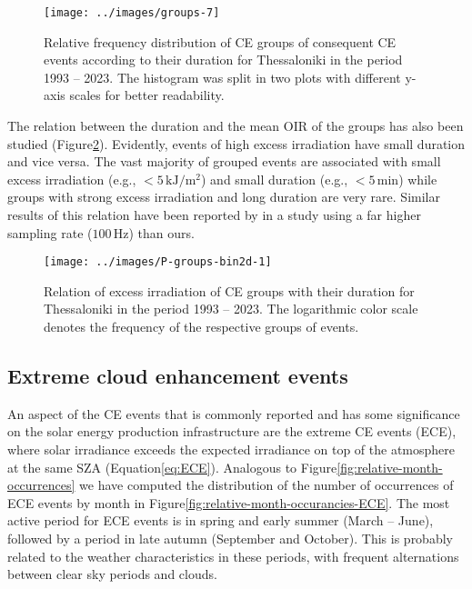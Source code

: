 \documentclass[preprint, 5p,
authoryear]{elsarticle} %
\begin{document}
\begin{figure}

{\centering \texttt{[image: ../images/groups-7]} 

}

\caption{Relative frequency distribution of CE groups of consequent CE events according to their duration for Thessaloniki in the period 1993 -- 2023. The histogram was split in two plots with different y-axis scales for better readability.}\label{fig:ceg-duration-distribution}
\end{figure}

The relation between the duration and the mean OIR of the groups has
also been studied (Figure\nobreakspace{}\ref{fig:group-2d}). Evidently,
events of high excess irradiation have small duration and vice versa.
The vast majority of grouped events are associated with small excess
irradiation (e.g., \(<5\,\text{kJ}/\text{m}^2\)) and small duration
(e.g., \(<5\,\text{min}\)) while groups with strong excess irradiation
and long duration are very rare. Similar results of this relation have
been reported by \citet{Zhang2018} in a study using a far higher
sampling rate (\(100\,\text{Hz}\)) than ours.

\begin{figure}

{\centering \texttt{[image: ../images/P-groups-bin2d-1]} 

}

\caption{Relation of excess irradiation of CE groups with their duration for Thessaloniki in the period 1993 -- 2023. The logarithmic color scale denotes the frequency of the respective groups of events.}\label{fig:group-2d}
\end{figure}

\hypertarget{extreme-cloud-enhancement-events}{%
\subsection{Extreme cloud enhancement
events}\label{extreme-cloud-enhancement-events}}

An aspect of the CE events that is commonly reported and has some
significance on the solar energy production infrastructure are the
extreme CE events (ECE), where solar irradiance exceeds the expected
irradiance on top of the atmosphere at the same SZA
(Equation\nobreakspace{}\ref{eq:ECE}). Analogous to
Figure\nobreakspace{}\ref{fig:relative-month-occurrences} we have
computed the distribution of the number of occurrences of ECE events by
month in Figure\nobreakspace{}\ref{fig:relative-month-occurancies-ECE}.
The most active period for ECE events is in spring and early summer
(March -- June), followed by a period in late autumn (September and
October). This is probably related to the weather characteristics in
these periods, with frequent alternations between clear sky periods and
clouds.
\end{document}
